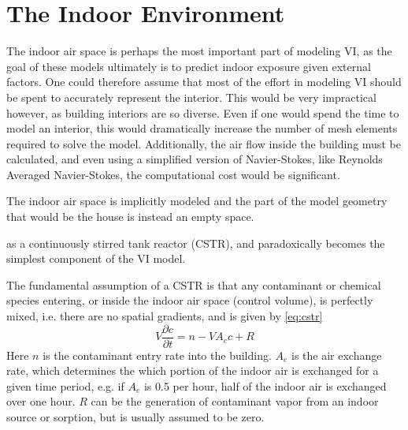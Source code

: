 \section{The Indoor Environment}

The indoor air space is perhaps the most important part of modeling VI, as the goal of these models ultimately is to predict indoor exposure given external factors.
One could therefore assume that most of the effort in modeling VI should be spent to accurately represent the interior.
This would be very impractical however, as building interiors are so diverse.
Even if one would spend the time to model an interior, this would dramatically increase the number of mesh elements required to solve the model.
Additionally, the air flow inside the building must be calculated, and even using a simplified version of Navier-Stokes, like Reynolds Averaged Navier-Stokes, the computational cost would be significant.\par

The indoor air space is implicitly modeled and the part of the model geometry that would be the house is instead an empty space.

as a continuously stirred tank reactor (CSTR), and paradoxically becomes the simplest component of the VI model.\par



The fundamental assumption of a CSTR is that any contaminant or chemical species entering, or inside the indoor air space (control volume), is perfectly mixed, i.e. there are no spatial gradients, and is given by \eqref{eq:cstr}
\begin{equation}\label{eq:cstr}
  V\frac{\partial c}{\partial t} = n - V A_e c + R
\end{equation}
Here $n$ is the contaminant entry rate into the building.
$A_e$ is the air exchange rate, which determines the which portion of the indoor air is exchanged for a given time period, e.g. if $A_e$ is 0.5 per hour, half of the indoor air is exchanged over one hour.
$R$ can be the generation of contaminant vapor from an indoor source or sorption, but is usually assumed to be zero.

